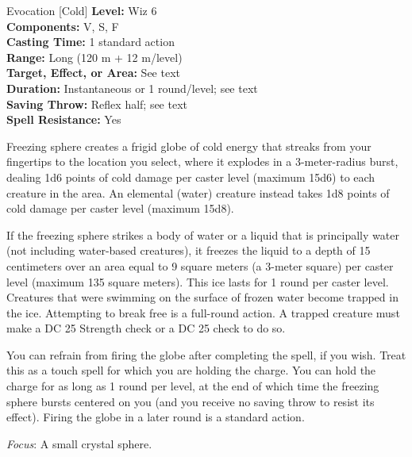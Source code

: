 {Evocation [Cold]}
{
	\textbf{Level:}
	Wiz 6\\
	\textbf{Components:}
	V, S, F\\
	\textbf{Casting Time:}
	1 standard action\\
	\textbf{Range:}
	Long (120 m + 12 m/level)\\
	\textbf{Target, Effect, or Area:}
	See text\\
	\textbf{Duration:}
	Instantaneous or 1 round/level; see text\\
	\textbf{Saving Throw:}
	Reflex half; see text\\
	\textbf{Spell Resistance:}
	Yes\\
}
{
	Freezing sphere creates a frigid globe of cold energy that streaks from your fingertips to the location you select, where it explodes in a 3-meter-radius burst, dealing 1d6 points of cold damage per caster level (maximum 15d6) to each creature in the area. An elemental (water) creature instead takes 1d8 points of cold damage per caster level (maximum 15d8).

	If the freezing sphere strikes a body of water or a liquid that is principally water (not including water-based creatures), it freezes the liquid to a depth of 15 centimeters over an area equal to 9 square meters (a 3-meter square) per caster level (maximum 135 square meters). This ice lasts for 1 round per caster level. Creatures that were swimming on the surface of frozen water become trapped in the ice. Attempting to break free is a full-round action. A trapped creature must make a DC 25 Strength check or a DC 25  check to do so.

	You can refrain from firing the globe after completing the spell, if you wish. Treat this as a touch spell for which you are holding the charge. You can hold the charge for as long as 1 round per level, at the end of which time the freezing sphere bursts centered on you (and you receive no saving throw to resist its effect). Firing the globe in a later round is a standard action.

	\textit{Focus}:
	A small crystal sphere.

}
